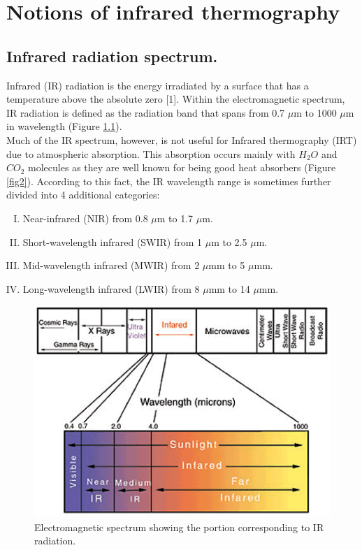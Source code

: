\chapter{Notions of infrared thermography}

	\section{Infrared radiation spectrum.}
	
		Infrared (IR) radiation is the energy irradiated by a surface that has a temperature above the absolute zero [1]. Within the electromagnetic spectrum, IR radiation is defined as the radiation band that spans from 0.7 $\mu$m to 1000 $\mu$m in wavelength (Figure \ref{fig1}).\\ Much of the IR spectrum, however, is not useful for Infrared thermography (IRT) due to atmospheric absorption. This absorption occurs mainly with $H_{2}O$ and $CO_{2}$ molecules as they are well known for being good heat absorbers (Figure \ref{fig2}). According to this fact, the IR wavelength range is sometimes further divided into 4 additional categories:

		\begin{enumerate}[I.]
			\item Near-infrared (NIR) from 0.8 $\mu$m to 1.7 $\mu$m.
			\item Short-wavelength infrared (SWIR) from 1 $\mu$m to 2.5 $\mu$m.
			\item Mid-wavelength infrared (MWIR) from 2 $\mu$mm to 5 $\mu$mm.
			\item Long-wavelength infrared (LWIR) from 8 $\mu$mm to 14 $\mu$mm.
		\end{enumerate}
		
		\begin{figure}[ht!]
			\centering
			\captionsetup{justification=centering,margin=2cm}
			\includegraphics[scale=0.75]{Figures/Chapter01/lightspectrum}
			\caption{\label{fig1} Electromagnetic spectrum showing the portion corresponding to IR radiation.}
		\end{figure}
		
